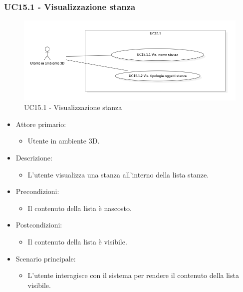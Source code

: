 \subsubsection{UC15.1 - Visualizzazione stanza}

\begin{figure}[H]
  \renewcommand{\thefigure}{16}
  \includegraphics[width=\linewidth]{./res/images/UC15.1.png}
  \caption{UC15.1 - Visualizzazione stanza}
  \label{fig:UC 15.1}
\end{figure}

\begin{itemize}

	\item Attore primario: 
	\begin{itemize}
		\item Utente in ambiente 3D.
	\end{itemize}
	\item Descrizione:
	\begin{itemize}
		\item L'utente visualizza una stanza all'interno della lista stanze.
	\end{itemize}
	
	\item Precondizioni:
	\begin{itemize}
		\item Il contenuto della lista è nascosto.
	\end{itemize}
	
	\item Postcondizioni:
	\begin{itemize}
		\item Il contenuto della lista è visibile.
	\end{itemize}
	
	\item Scenario principale:
	\begin{itemize}
		\item L'utente interagisce con il sistema per rendere il contenuto della lista visibile.
	\end{itemize}
	
\end{itemize}

